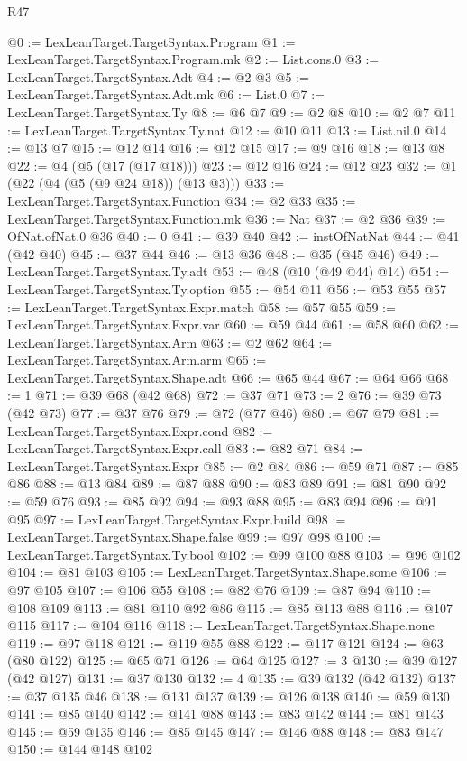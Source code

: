 \begin{lexlean}{R47}
\begin{coremodule}
@0 := LexLeanTarget.TargetSyntax.Program
@1 := LexLeanTarget.TargetSyntax.Program.mk
@2 := List.cons.{0}
@3 := LexLeanTarget.TargetSyntax.Adt
@4 := @2 @3
@5 := LexLeanTarget.TargetSyntax.Adt.mk
@6 := List.{0}
@7 := LexLeanTarget.TargetSyntax.Ty
@8 := @6 @7
@9 := @2 @8
@10 := @2 @7
@11 := LexLeanTarget.TargetSyntax.Ty.nat
@12 := @10 @11
@13 := List.nil.{0}
@14 := @13 @7
@15 := @12 @14
@16 := @12 @15
@17 := @9 @16
@18 := @13 @8
@22 := @4 (@5 (@17 (@17 @18)))
@23 := @12 @16
@24 := @12 @23
@32 := @1 (@22 (@4 (@5 (@9 @24 @18)) (@13 @3)))
@33 := LexLeanTarget.TargetSyntax.Function
@34 := @2 @33
@35 := LexLeanTarget.TargetSyntax.Function.mk
@36 := Nat
@37 := @2 @36
@39 := OfNat.ofNat.{0} @36
@40 := 0
@41 := @39 @40
@42 := instOfNatNat
@44 := @41 (@42 @40)
@45 := @37 @44
@46 := @13 @36
@48 := @35 (@45 @46)
@49 := LexLeanTarget.TargetSyntax.Ty.adt
@53 := @48 (@10 (@49 @44) @14)
@54 := LexLeanTarget.TargetSyntax.Ty.option
@55 := @54 @11
@56 := @53 @55
@57 := LexLeanTarget.TargetSyntax.Expr.match
@58 := @57 @55
@59 := LexLeanTarget.TargetSyntax.Expr.var
@60 := @59 @44
@61 := @58 @60
@62 := LexLeanTarget.TargetSyntax.Arm
@63 := @2 @62
@64 := LexLeanTarget.TargetSyntax.Arm.arm
@65 := LexLeanTarget.TargetSyntax.Shape.adt
@66 := @65 @44
@67 := @64 @66
@68 := 1
@71 := @39 @68 (@42 @68)
@72 := @37 @71
@73 := 2
@76 := @39 @73 (@42 @73)
@77 := @37 @76
@79 := @72 (@77 @46)
@80 := @67 @79
@81 := LexLeanTarget.TargetSyntax.Expr.cond
@82 := LexLeanTarget.TargetSyntax.Expr.call
@83 := @82 @71
@84 := LexLeanTarget.TargetSyntax.Expr
@85 := @2 @84
@86 := @59 @71
@87 := @85 @86
@88 := @13 @84
@89 := @87 @88
@90 := @83 @89
@91 := @81 @90
@92 := @59 @76
@93 := @85 @92
@94 := @93 @88
@95 := @83 @94
@96 := @91 @95
@97 := LexLeanTarget.TargetSyntax.Expr.build
@98 := LexLeanTarget.TargetSyntax.Shape.false
@99 := @97 @98
@100 := LexLeanTarget.TargetSyntax.Ty.bool
@102 := @99 @100 @88
@103 := @96 @102
@104 := @81 @103
@105 := LexLeanTarget.TargetSyntax.Shape.some
@106 := @97 @105
@107 := @106 @55
@108 := @82 @76
@109 := @87 @94
@110 := @108 @109
@113 := @81 @110 @92 @86
@115 := @85 @113 @88
@116 := @107 @115
@117 := @104 @116
@118 := LexLeanTarget.TargetSyntax.Shape.none
@119 := @97 @118
@121 := @119 @55 @88
@122 := @117 @121
@124 := @63 (@80 @122)
@125 := @65 @71
@126 := @64 @125
@127 := 3
@130 := @39 @127 (@42 @127)
@131 := @37 @130
@132 := 4
@135 := @39 @132 (@42 @132)
@137 := @37 @135 @46
@138 := @131 @137
@139 := @126 @138
@140 := @59 @130
@141 := @85 @140
@142 := @141 @88
@143 := @83 @142
@144 := @81 @143
@145 := @59 @135
@146 := @85 @145
@147 := @146 @88
@148 := @83 @147
@150 := @144 @148 @102

\end{coremodule}
\end{lexlean}
